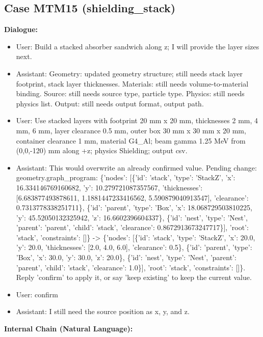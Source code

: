 \documentclass[11pt]{ctexart}
\begin{document}
\subsection{Case MTM15 (shielding\_stack)}
\textbf{Dialogue:}
\begin{itemize}
\item User: Build a stacked absorber sandwich along z; I will provide the layer sizes next.
\item Assistant: Geometry: updated geometry structure; still needs stack layer footprint, stack layer thicknesses. Materials: still needs volume-to-material binding. Source: still needs source type, particle type. Physics: still needs physics list. Output: still needs output format, output path.
\item User: Use stacked layers with footprint 20 mm x 20 mm, thicknesses 2 mm, 4 mm, 6 mm, layer clearance 0.5 mm, outer box 30 mm x 30 mm x 20 mm, container clearance 1 mm, material G4\_Al; beam gamma 1.25 MeV from (0,0,-120) mm along +z; physics Shielding; output csv.
\item Assistant: This would overwrite an already confirmed value. Pending change: geometry.graph\_program: \{'nodes': [\{'id': 'stack', 'type': 'StackZ', 'x': 16.334146769160682, 'y': 10.279721087357567, 'thicknesses': [6.683877493878611, 1.1881447233416562, 5.590879040913547], 'clearance': 0.7313778338251711\}, \{'id': 'parent', 'type': 'Box', 'x': 18.068729503810225, 'y': 45.52050132325942, 'z': 16.6602396604337\}, \{'id': 'nest', 'type': 'Nest', 'parent': 'parent', 'child': 'stack', 'clearance': 0.8672913673247717\}], 'root': 'stack', 'constraints': []\} -> \{'nodes': [\{'id': 'stack', 'type': 'StackZ', 'x': 20.0, 'y': 20.0, 'thicknesses': [2.0, 4.0, 6.0], 'clearance': 0.5\}, \{'id': 'parent', 'type': 'Box', 'x': 30.0, 'y': 30.0, 'z': 20.0\}, \{'id': 'nest', 'type': 'Nest', 'parent': 'parent', 'child': 'stack', 'clearance': 1.0\}], 'root': 'stack', 'constraints': []\}. Reply 'confirm' to apply it, or say 'keep existing' to keep the current value.
\item User: confirm
\item Assistant: I still need the source position as x, y, and z.
\end{itemize}
\textbf{Internal Chain (Natural Language):}
\end{document}
